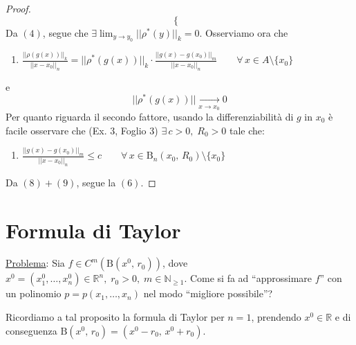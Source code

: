 \begin{proof}
$$\begin{cases}
\end{cases}
$$
Da $(4)$, segue che $\displaystyle \exists \lim_{y \rightarrow y_0} ||\rho^*(y)||_k = 0$. Osserviamo ora che
\begin{enumerate}[labelindent=\parindent,leftmargin=*,label=\textnormal{(\arabic*)},start=8]
\item $\displaystyle \frac{||\rho(g(x))||_k}{||x-x_0||_n} =
||\rho^*(g(x))||_k \cdot \frac{||g(x)-g(x_0)||_m}{||x-x_0||_n} \qquad \forall \, x \in A \setminus \lbrace x_0 \rbrace
$
\end{enumerate}
e $$ ||\rho^*(g(x))|| \underset{x \rightarrow x_0}{\longrightarrow} 0$$
Per quanto riguarda il secondo fattore, usando la differenziabilità di $g$ in $x_0$ è facile osservare che (Ex. 3, Foglio 3) $\exists \, c > 0, \; R_0 > 0$ tale che:
\begin{enumerate}[labelindent=\parindent,leftmargin=*,label=\textnormal{(\arabic*)},start=9]
\item $\displaystyle \frac{||g(x)-g(x_0)||_m}{||x-x_0||_n} \leq c \qquad \forall \, x \in \mathrm{B}_n (x_0,\,R_0) \setminus \lbrace x_0 \rbrace$
\end{enumerate}
Da $(8)+(9)$, segue la $(6)$.
\end{proof}



\section{Formula di Taylor}
\underline{Problema}: Sia $f \in C^m(\mathrm{B}(x^0,\,r_0))$, dove $x^0=(x^0_1,\ldots,x^0_n) \in \mathbb{R}^n, \; r_0 > 0, \; m \in \mathbb{N}_{\geq 1}$.
Come si fa ad ``approssimare $f$'' con un polinomio $p=p(x_1,\ldots,x_n)$ nel modo ``migliore possibile''?

Ricordiamo a tal proposito la formula di Taylor per $n=1$, prendendo $x^0 \in \mathbb{R}$ e di conseguenza $\mathrm{B}(x^0,\,r_0)=(x^0-r_0,\,x^0+r_0)$.

